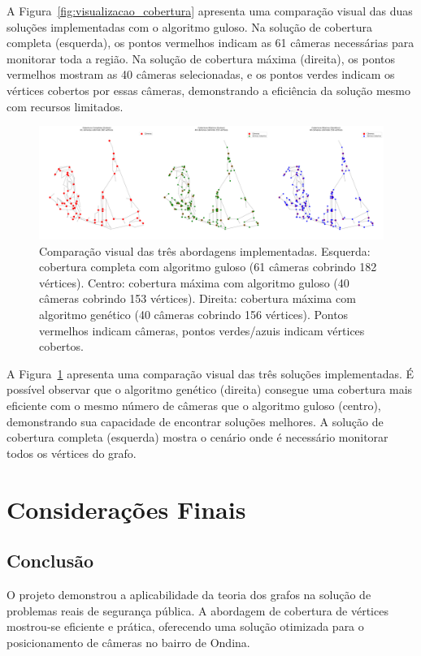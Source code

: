 \documentclass[12pt, a4paper]{report}
\begin{document}
A Figura~\ref{fig:visualizacao_cobertura} apresenta uma comparação visual das duas soluções implementadas com o algoritmo guloso. Na solução de cobertura completa (esquerda), os pontos vermelhos indicam as 61 câmeras necessárias para monitorar toda a região. Na solução de cobertura máxima (direita), os pontos vermelhos mostram as 40 câmeras selecionadas, e os pontos verdes indicam os vértices cobertos por essas câmeras, demonstrando a eficiência da solução mesmo com recursos limitados.

\begin{figure}[H]
    \centering
    \includegraphics[width=\textwidth]{visualizacao_comparacao}
    \caption{Comparação visual das três abordagens implementadas. Esquerda: cobertura completa com algoritmo guloso (61 câmeras cobrindo 182 vértices). Centro: cobertura máxima com algoritmo guloso (40 câmeras cobrindo 153 vértices). Direita: cobertura máxima com algoritmo genético (40 câmeras cobrindo 156 vértices). Pontos vermelhos indicam câmeras, pontos verdes/azuis indicam vértices cobertos.}
    \label{fig:visualizacao_comparacao}
\end{figure}

A Figura~\ref{fig:visualizacao_comparacao} apresenta uma comparação visual das três soluções implementadas. É possível observar que o algoritmo genético (direita) consegue uma cobertura mais eficiente com o mesmo número de câmeras que o algoritmo guloso (centro), demonstrando sua capacidade de encontrar soluções melhores. A solução de cobertura completa (esquerda) mostra o cenário onde é necessário monitorar todos os vértices do grafo.

\chapter{Considerações Finais}

\section{Conclusão}
O projeto demonstrou a aplicabilidade da teoria dos grafos na solução de problemas reais de segurança pública. A abordagem de cobertura de vértices mostrou-se eficiente e prática, oferecendo uma solução otimizada para o posicionamento de câmeras no bairro de Ondina.
\end{document}
